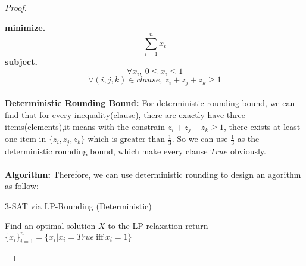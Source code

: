 \documentclass[12pt,a4paper]{article}
\theoremstyle{definition}
\begin{document}
\begin{enumerate}
\begin{proof}
\begin{itemize}
        \textbf{minimize.} $$\sum_{i=1}^{n}x_i $$
        \textbf{subject.} $$\forall x_i,\ 0 \leq x_i\leq 1 $$
                          $$\forall(i,j,k)\in clause,\ z_i+z_j+z_k\geq 1 $$
        \\ \textbf{Deterministic Rounding Bound:} For deterministic rounding bound, we can find that for every inequality(clause), there are exactly have three items(elements),it means with the constrain $z_i+z_j+z_k\geq 1$, there exists at least one item in $\{z_i, z_j, z_k\}$ which is greater than $\frac{1}{3} $. So we can use $\frac{1}{3} $ as the deterministic rounding bound, which make every clause $True$ obviously.
        \\ \\ \textbf{Algorithm:} Therefore, we can use deterministic rounding to design an agorithm as follow:\\
        \begin{minipage}[t]{0.8\textwidth}
        \begin{algorithm}[H]
            \caption{3-SAT via LP-Rounding (Deterministic)}
            \label{ALG1}
            Find an optimal solution \textbf{$X$} to the LP-relaxation\;
            return $\{x_i\}_{i=1}^n=\{x_i|x_i=True\ \text{iff}\ x_i=1 \} $\;


\end{algorithm}
\end{minipage}
\end{itemize}
\end{proof}
\end{enumerate}
\end{document}
